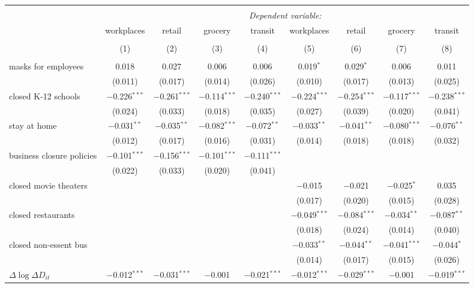 \begin{tabular}{@{\extracolsep{1pt}}lcccccccc} 
\\[-1.8ex]\hline 
\hline \\[-1.8ex] 
 & \multicolumn{8}{c}{\textit{Dependent variable:}} \\ 
\cline{2-9} 
 & workplaces & retail & grocery & transit & workplaces & retail & grocery & transit \\ 
\\[-1.8ex] & (1) & (2) & (3) & (4) & (5) & (6) & (7) & (8)\\ 
\hline \\[-1.8ex] 
 masks for employees & 0.018 & 0.027 & 0.006 & 0.006 & 0.019$^{*}$ & 0.029$^{*}$ & 0.006 & 0.011 \\ 
  & (0.011) & (0.017) & (0.014) & (0.026) & (0.010) & (0.017) & (0.013) & (0.025) \\ 
  closed K-12 schools & $-$0.226$^{***}$ & $-$0.261$^{***}$ & $-$0.114$^{***}$ & $-$0.240$^{***}$ & $-$0.224$^{***}$ & $-$0.254$^{***}$ & $-$0.117$^{***}$ & $-$0.238$^{***}$ \\ 
  & (0.024) & (0.033) & (0.018) & (0.035) & (0.027) & (0.039) & (0.020) & (0.041) \\ 
  stay at home & $-$0.031$^{**}$ & $-$0.035$^{**}$ & $-$0.082$^{***}$ & $-$0.072$^{**}$ & $-$0.033$^{**}$ & $-$0.041$^{**}$ & $-$0.080$^{***}$ & $-$0.076$^{**}$ \\ 
  & (0.012) & (0.017) & (0.016) & (0.031) & (0.014) & (0.018) & (0.018) & (0.032) \\ 
  business closure policies & $-$0.101$^{***}$ & $-$0.156$^{***}$ & $-$0.101$^{***}$ & $-$0.111$^{***}$ &  &  &  &  \\ 
  & (0.022) & (0.033) & (0.020) & (0.041) &  &  &  &  \\ 
  closed movie theaters &  &  &  &  & $-$0.015 & $-$0.021 & $-$0.025$^{*}$ & 0.035 \\ 
  &  &  &  &  & (0.017) & (0.020) & (0.015) & (0.028) \\ 
  closed restaurants &  &  &  &  & $-$0.049$^{***}$ & $-$0.084$^{***}$ & $-$0.034$^{**}$ & $-$0.087$^{**}$ \\ 
  &  &  &  &  & (0.018) & (0.024) & (0.014) & (0.040) \\ 
  closed non-essent bus &  &  &  &  & $-$0.033$^{**}$ & $-$0.044$^{**}$ & $-$0.041$^{***}$ & $-$0.044$^{*}$ \\ 
  &  &  &  &  & (0.014) & (0.017) & (0.015) & (0.026) \\ 
  $\Delta \log \Delta D_{it}$ & $-$0.012$^{***}$ & $-$0.031$^{***}$ & $-$0.001 & $-$0.021$^{***}$ & $-$0.012$^{***}$ & $-$0.029$^{***}$ & $-$0.001 & $-$0.019$^{***}$ \\ 

\end{tabular}
